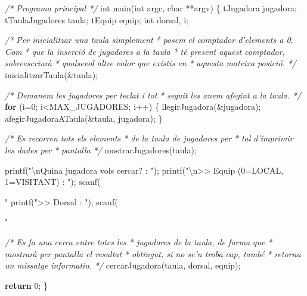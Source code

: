 \documentclass[]{book}
\newenvironment{Shaded}{\begin{snugshade}}{\end{snugshade}}
\newcommand{\DataTypeTok}[1]{\textcolor[rgb]{0.13,0.29,0.53}{#1}}
\newcommand{\DecValTok}[1]{\textcolor[rgb]{0.00,0.00,0.81}{#1}}
\newcommand{\SpecialCharTok}[1]{\textcolor[rgb]{0.00,0.00,0.00}{#1}}
\newcommand{\StringTok}[1]{\textcolor[rgb]{0.31,0.60,0.02}{#1}}
\newcommand{\CommentTok}[1]{\textcolor[rgb]{0.56,0.35,0.01}{\textit{#1}}}
\newcommand{\ControlFlowTok}[1]{\textcolor[rgb]{0.13,0.29,0.53}{\textbf{#1}}}
\newcommand{\NormalTok}[1]{#1}
\begin{document}
\begin{Shaded}
\begin{Highlighting}[]
\CommentTok{/* Programa principal */}
\DataTypeTok{int}\NormalTok{ main(}\DataTypeTok{int}\NormalTok{ argc, }\DataTypeTok{char}\NormalTok{ **argv) \{}
\NormalTok{    tJugadora jugadora;}
\NormalTok{    tTaulaJugadores taula;}
\NormalTok{    tEquip equip;}
    \DataTypeTok{int}\NormalTok{ dorsal, i;}
    
    \CommentTok{/* Per inicialitzar una taula simplement}
\CommentTok{     * posem el comptador d'elements a 0. Com}
\CommentTok{     * que la inserció de jugadores a la taula}
\CommentTok{     * té present aquest comptador, sobreescriurà}
\CommentTok{     * qualsevol altre valor que existís en }
\CommentTok{     * aquesta mateixa posició.}
\CommentTok{     */}
\NormalTok{    inicialitzarTaula(&taula);}
    
    \CommentTok{/* Demanem les jugadores per teclat i tot}
\CommentTok{     * seguit les anem afegint a la taula.}
\CommentTok{     */}
    \ControlFlowTok{for}\NormalTok{ (i=}\DecValTok{0}\NormalTok{; i<MAX_JUGADORES; i++) \{}
\NormalTok{        llegirJugadora(&jugadora);}
\NormalTok{        afegirJugadoraATaula(&taula, jugadora);}
\NormalTok{    \}}
    
    \CommentTok{/* Es recorren tots els elements}
\CommentTok{     * de la taula de jugadores per}
\CommentTok{     * tal d'imprimir les dades per }
\CommentTok{     * pantalla}
\CommentTok{     */}
\NormalTok{    mostrarJugadores(taula);}
    
\NormalTok{    printf(}\StringTok{"}\SpecialCharTok{\textbackslash{}n}\StringTok{Quina jugadora vols cercar? : "}\NormalTok{);}
\NormalTok{    printf(}\StringTok{"}\SpecialCharTok{\textbackslash{}n}\StringTok{>> Equip (0=LOCAL, 1=VISITANT) : "}\NormalTok{);}
\NormalTok{    scanf(}\StringTok{"%
\NormalTok{    printf(}\StringTok{">> Dorsal : "}\NormalTok{);}
\NormalTok{    scanf(}\StringTok{"%
    
    \CommentTok{/* Es fa una cerca entre totes les}
\CommentTok{     * jugadores de la taula, de forma que}
\CommentTok{     * mostrarà per pantalla el resultat}
\CommentTok{     * obtingut; si no se'n troba cap, també}
\CommentTok{     * retorna un missatge informatiu.}
\CommentTok{     */}
\NormalTok{    cercarJugadora(taula, dorsal, equip);}
     
    \ControlFlowTok{return} \DecValTok{0}\NormalTok{;}
\NormalTok{\}}

}}
\end{Highlighting}
\end{Shaded}
\end{document}
